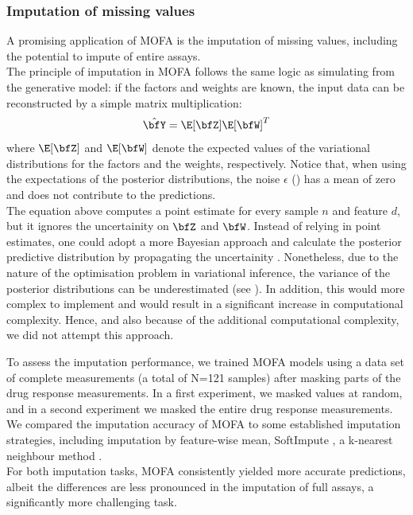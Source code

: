 \subsubsection{Imputation of missing values}

A promising application of MOFA is the imputation of missing values, including the potential to impute of entire assays.\\
The principle of imputation in MOFA follows the same logic as simulating from the generative model: if the factors and weights are known, the input data can be reconstructed by a simple matrix multiplication:
\[
	\hat{\bfY} = \E[\bfZ] \E[\bfW]^T
\]
where $\E[\bfZ]$ and $\E[\bfW]$ denote the expected values of the variational distributions for the factors and the weights, respectively. Notice that, when using the expectations of the posterior distributions, the noise $\epsilon$ () has a mean of zero and does not contribute to the predictions.\\
The equation above computes a point estimate for every sample $n$ and feature $d$, but it ignores the uncertainity on $\bfZ$ and $\bfW$. Instead of relying in point estimates, one could adopt a more Bayesian approach and calculate the posterior predictive distribution by propagating the uncertainity \cite{Gelman2013}. Nonetheless, due to the nature of the optimisation problem in variational inference, the variance of the posterior distributions can be underestimated (see ). In addition, this would more complex to implement and would result in a significant increase in computational complexity. 
Hence, and also because of the additional computational complexity, we did not attempt this approach.

To assess the imputation performance, we trained MOFA models using a data set of complete measurements (a total of N=121 samples) after masking parts of the drug response measurements. In a first experiment, we masked values at random, and in a second experiment we masked the entire drug response measurements. We compared the imputation accuracy of MOFA to some established imputation strategies, including imputation by feature-wise mean, SoftImpute \cite{Mazumder2010}, a k-nearest neighbour method \cite{Troyanskaya2001}.\\
For both imputation tasks, MOFA consistently yielded more accurate predictions, albeit the differences are less pronounced in the imputation of full assays, a significantly more challenging task.

